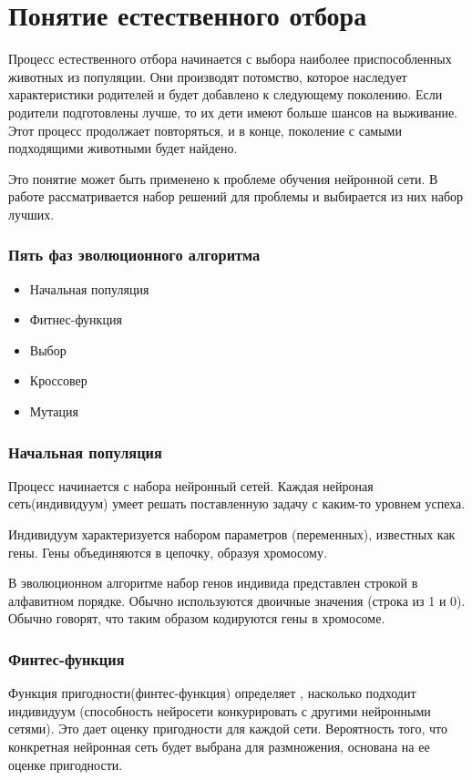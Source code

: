 \section{Понятие естественного отбора}

Процесс естественного отбора начинается с выбора наиболее приспособленных животных из популяции. Они производят потомство, которое наследует характеристики родителей и будет добавлено к следующему поколению. Если родители подготовлены лучше, то их дети имеют больше шансов на выживание. Этот процесс продолжает повторяться, и в конце, поколение с самыми подходящими животными будет найдено.

Это понятие может быть применено к проблеме обучения нейронной сети. В работе рассматривается набор решений для проблемы и выбирается из них набор лучших.

\subsubsection{Пять фаз эволюционного алгоритма}
\begin{itemize}
  \item Начальная популяция
  \item Фитнес-функция
  \item Выбор
  \item Кроссовер
  \item Мутация
\end{itemize}

\subsubsection{Начальная популяция}
Процесс начинается с набора нейронный сетей. Каждая нейроная сеть(индивидуум) умеет решать поставленную задачу с каким-то уровнем успеха.

Индивидуум характеризуется набором параметров (переменных), известных как гены. Гены объединяются в цепочку, образуя хромосому.

В эволюционном алгоритме набор генов индивида представлен строкой в алфавитном порядке. Обычно используются двоичные значения (строка из 1 и 0). Обычно говорят, что таким образом кодируются гены в хромосоме.

\subsubsection{Финтес-функция}
Функция пригодности(финтес-функция) определяет , насколько подходит индивидуум (способность нейросети конкурировать с другими нейронными сетями). Это дает оценку пригодности для каждой сети. Вероятность того, что конкретная нейронная сеть будет выбрана для размножения, основана на ее оценке пригодности.


